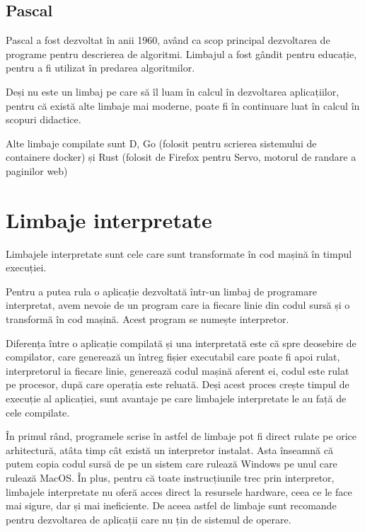 \subsection{Pascal}
\label{sec:appdev-langs-comp-ex-pascal}

Pascal a fost dezvoltat în anii 1960, având ca scop principal dezvoltarea de
programe pentru descrierea de algoritmi. Limbajul a fost gândit pentru educație,
pentru a fi utilizat în predarea algoritmilor.

Deși nu este un limbaj pe care să îl luam în calcul în dezvoltarea aplicațiilor,
pentru că există alte limbaje mai moderne, poate fi în continuare luat în calcul
în scopuri didactice.

Alte limbaje compilate sunt D, Go (folosit pentru scrierea sistemului de
containere docker) și Rust (folosit de Firefox pentru Servo, motorul de randare
a paginilor web)

\section{Limbaje interpretate}
\label{sec:appdev-langs-int}

Limbajele interpretate sunt cele care sunt transformate în cod mașină în timpul
execuției.

Pentru a putea rula o aplicație dezvoltată într-un limbaj de programare
interpretat, avem nevoie de un program care ia fiecare linie din codul sursă și
o transformă în cod mașină. Acest program se numește interpretor.

Diferența între o aplicație compilată și una interpretată este că spre deosebire
de compilator, care generează un întreg fișier executabil care poate fi apoi
rulat, interpretorul ia fiecare linie, generează codul mașină aferent ei, codul
este rulat pe procesor, după care operația este reluată. Deși acest proces
crește timpul de execuție al aplicației, sunt avantaje pe care limbajele
interpretate le au față de cele compilate.

În primul rând, programele scrise în astfel de limbaje pot fi direct rulate pe
orice arhitectură, atâta timp cât există un interpretor instalat. Asta înseamnă
că putem copia codul sursă de pe un sistem care rulează Windows pe unul care
rulează MacOS. În plus, pentru că toate instrucțiunile trec prin interpretor,
limbajele interpretate nu oferă acces direct la resursele hardware, ceea ce le
face mai sigure, dar și mai ineficiente. De aceea astfel de limbaje sunt
recomande pentru dezvoltarea de aplicații care nu țin de sistemul de operare.

